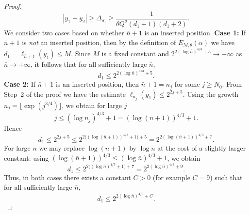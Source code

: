 \documentclass{article}
\numberwithin{equation}{section}
\begin{document}
{\begin{proof}
\[
|y_1 - y_2| \geq \Delta_{d_1} \geq \frac{1}{\theta Q^2 (d_1+1)(d_1+2)}.
\]
%
We consider two cases based on whether $\bar{n}+1$ is an inserted position.
% 
\newline
\noindent\textbf{Case 1:} If $\bar{n}+1$ is \emph{not} an inserted position, then by the definition of $E_{M,\theta}(\alpha)$ we have $d_1 = \ell_{\bar{n}+1}(y_1) \leq M$.  
Since $M$ is a fixed constant and $2^{2(\log \bar{n})^{4/3}+5} \to + \infty$ as $\bar{n} \to +\infty$, it follows that for all sufficiently large $\bar{n}$,
\[
d_1 \leq 2^{2(\log \bar{n})^{4/3}+5}.
\]
%
\noindent\textbf{Case 2:} If $\bar{n}+1$ is an inserted position, then $\bar{n}+1 = n_j$ for some $j \geq N_0$.  
From Step~2 of the proof we have the estimate $\ell_{n_j}(y_1) \leq 2^{2j+5}$.  
Using the growth $n_j = \lfloor \exp(j^{3/4}) \rfloor$, we obtain for large $j$
\[
j \leq (\log n_j)^{4/3} + 1 = (\log(\bar{n}+1))^{4/3} + 1.
\]
Hence
\[
d_1 \leq 2^{2j+5} \leq 2^{2\big((\log(\bar{n}+1))^{4/3}+1\big)+5} = 2^{2(\log(\bar{n}+1))^{4/3}+7}.
\]
For large $\bar{n}$ we may replace $\log(\bar{n}+1)$ by $\log \bar{n}$ at the cost of a slightly larger constant: using $(\log(\bar{n}+1))^{4/3} \leq (\log \bar{n})^{4/3} + 1$, we obtain
\[
d_1 \leq 2^{2\big((\log \bar{n})^{4/3}+1\big)+7} = 2^{2(\log \bar{n})^{4/3}+9}.
\]
%
Thus, in both cases there exists a constant $C>0$ (for example $C=9$) such that for all sufficiently large $\bar{n}$,
\[
d_1 \leq 2^{2(\log \bar{n})^{4/3}+C}.
\]


\end{proof}}
\end{document}
